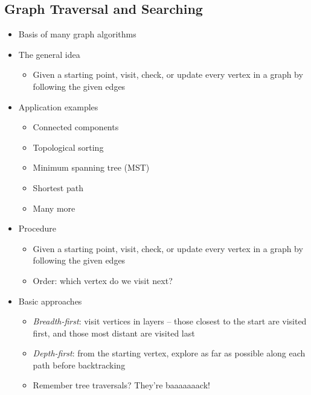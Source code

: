 \documentclass[
  10pt,
  english,
  letterpaper,
,tablecaptionabove
]{scrartcl}
\providecommand{\tightlist}{%
  \setlength{\itemsep}{0pt}\setlength{\parskip}{0pt}}
\begin{document}
\hypertarget{graph-traversal-and-searching}{%
\subsection{Graph Traversal and
Searching}\label{graph-traversal-and-searching}}

\begin{itemize}
\tightlist
\item
  Basis of many graph algorithms
\item
  The general idea

  \begin{itemize}
  \tightlist
  \item
    Given a starting point, visit, check, or update every vertex in a
    graph by following the given edges
  \end{itemize}
\item
  Application examples

  \begin{itemize}
  \tightlist
  \item
    Connected components
  \item
    Topological sorting
  \item
    Minimum spanning tree (MST)
  \item
    Shortest path
  \item
    Many more
  \end{itemize}
\item
  Procedure

  \begin{itemize}
  \tightlist
  \item
    Given a starting point, visit, check, or update every vertex in a
    graph by following the given edges
  \item
    Order: which vertex do we visit next?
  \end{itemize}
\item
  Basic approaches

  \begin{itemize}
  \tightlist
  \item
    \emph{Breadth-first}: visit vertices in layers -- those closest to
    the start are visited first, and those most distant are visited last
  \item
    \emph{Depth-first}: from the starting vertex, explore as far as
    possible along each path before backtracking
  \item
    Remember tree traversals? They're baaaaaaack!
  \end{itemize}
\end{itemize}
\end{document}
